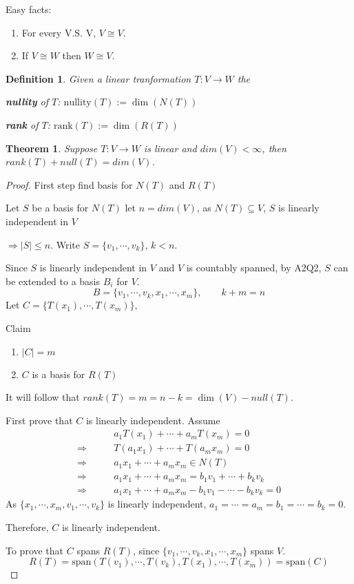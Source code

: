\documentclass[12pt]{article}
\theoremstyle{plain}
\newtheorem{theorem}{Theorem}[subsection]
\newtheorem{definition}{Definition}[subsection]
\newcommand{\Span}{\mathrm{span}}
\newcommand{\rank}{\mathrm{rank}}
\newcommand{\nullity}{\mathrm{nullity}}
\newcommand{\abs}[1]{\left| #1 \right|}
\begin{document}
	Easy facts: 
	\begin{enumerate}
		\item For every V.S. V, $V\cong V$. 
		\item If $V \cong W$ then $W\cong V$.
	\end{enumerate}

	\begin{definition}
		Given a linear tranformation $T : V\to W$ the
		\begin{description}
			\item \textbf{nullity} of $T$: $\nullity(T) := \dim(N(T))$
			\item \textbf{rank} of $T$: $\rank(T) := \dim(R(T))$ 
		\end{description}
	\end{definition}

	\begin{theorem}
		Suppose $T: V \to W$ is linear and $dim (V) < \infty$, 
		then $rank(T) + null(T) = dim(V)$. 
	\end{theorem}
	\begin{proof}
		First step find basis for $N(T)$ and $R(T)$

		Let $S$ be a basis for $N(T)$ let $n = dim (V)$, as $N(T)\subseteq V$, 
		$S$ is linearly independent in $V$ 

		$\Rightarrow |S|\leq n$. Write $S = \{v_1, \cdots, v_k\}$, $k<n$. 
		
		Since $S$ is linearly independent in $V$ and $V$ is countably spanned,
		by A2Q2, $S$ can be extended to a basis $B_i$ for $V$. 
		\[
			B = \{v_1, \cdots, v_k, x_1, \cdots, x_m\}, \qquad
			k + m = n
		\]
		Let $C = \{T(x_1), \cdots, T(x_m)\}$, 

		Claim
		\begin{enumerate}
			\item $\abs{C} = m$
			\item $C$ is a basis for $R(T)$ 
		\end{enumerate}
		
		It will follow that $rank(T) = m = n - k = \dim(V) - null(T)$. 

		First prove that $C$ is linearly independent. 
		Assume 
		\begin{align*}
			&a_1T(x_1)+ \cdots + a_mT(x_m) = 0\\
			\Rightarrow \qquad 
			& T(a_1x_1)+\cdots+T(a_mx_m) = 0\\
			\Rightarrow \qquad 
			& a_1x_1 + \cdots + a_mx_m \in N(T)\\
			\Rightarrow \qquad 
			& a_1x_1 + \cdots + a_mx_m = b_1 v_1 + \cdots + b_kv_k\\
			\Rightarrow \qquad 
			& a_1x_1 + \cdots + a_mx_m - b_1 v_1 - \cdots - b_kv_k = 0
		\end{align*}
		As $\{x_1, \cdots, x_m, v_1, \cdots, v_k\}$ is linearly independent,
		$a_1= \cdots= a_m = b_1= \cdots= b_k = 0$.

		Therefore, $C$ is linearly independent. 
		
		To prove that $C$ spans $R(T)$, since $\{v_1, \cdots, v_k, x_1,\cdots,
		x_m\}$ spans $V$. 
		\[
			R(T)=\Span(T(v_1), \cdots, T(v_k), T(x_1), \cdots, T(x_m))
			=\Span(C)
		\]
	\end{proof}
\end{document}
